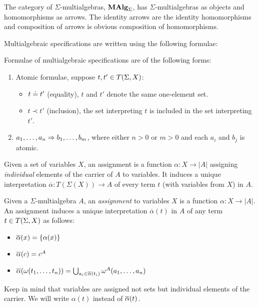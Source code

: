 \begin{definition} 
The category of $\Sigma$-multialgebras, ${\bf MAlg}_{\Sigma}$, has $\Sigma$-multialgebras as
objects and homomorphisms as arrows.  The identity arrows are the identity
homomorphisms and composition of arrows is obvious composition of
homomorphisms.
\end{definition} 
Multialgebraic specifications are written using the following formulae:
%
\begin{definition}\label{def:masen}
Formulae of multialgebraic specifications are of the following forms:
\begin{enumerate}\MyLPar
\item Atomic formulae, suppose $t, t' \in T(\Sigma,X)$:
\begin{itemize}\MyLPar
\item $t \mathrel{\dot{=} }  t'$ (equality), $t$ and $t'$ denote the same one-element set.
\item $t \prec t'$ (inclusion), the set interpreting $t$ is included in
the set interpreting $t'$.
\end{itemize}
\item $a_1 , \ldots ,a_n \Rightarrow b_1 , \ldots ,b_m$, where either $n>0$ or $m>0$ and
each $a_i$ and $b_j$ is atomic.
\end{enumerate}
\end{definition}
%
Given a set of variables $X$, an assignment is a function $\alpha: X \to |A|$ 
assigning {\em individual} elements of the carrier of $A$ to variables. It induces a unique
interpretation $\overline{\alpha}: T(\Sigma(X)) \to A$ of every term $t$
(with variables from $X$) in
$A$.
\begin{definition} Given a $\Sigma$-multialgebra $A$, an {\it assignment} to 
variables $X$ is a function $\alpha:X \to |A|$. An assignment induces a
unique interpretation $\overline{\alpha}(t)$ in $A$ of any term $t \in T(\Sigma,X)$ as
follows:
\begin{itemize}\MyLPar
\item $\overline{\alpha}(x)=\{\alpha(x)\}$
\item $\overline{\alpha}(c)=c^A$
\item $\overline{\alpha}(\omega(t_1 , \ldots ,t_n)) = \bigcup_{a_{i}\in\overline{\alpha}(t_{i})}\omega^A(a_1 , \ldots ,a_n)$
\end{itemize}
\end{definition}
Keep in mind that variables are assigned not sets but individual
elements of the carrier. 
We will write $\alpha(t)$ instead of $\overline{\alpha}(t)$.
 
